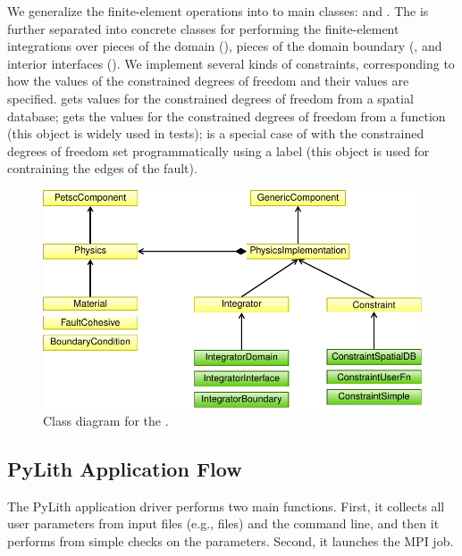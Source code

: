 We generalize the finite-element operations into to main classes:
 and . The 
is further separated into concrete classes for performing the
finite-element integrations over pieces of the domain
(), pieces of the domain boundary
(, and interior interfaces
(). We implement several kinds of
constraints, corresponding to how the values of the constrained
degrees of freedom and their values are
specified.  gets values for the
constrained degrees of freedom from a spatial database;
 gets the values for the constrained degrees
of freedom from a function (this object is widely used in tests);
 is a special case of
 with the constrained degrees of freedom set
programmatically using a label (this object is used for contraining
the edges of the fault).

\begin{figure}[htbp]
  \includegraphics[scale=0.8]{developer/figs/physics_classdiagram}
  \caption{Class diagram for the .}
  \label{fig:developer:physics:class}
\end{figure}

\subsection{PyLith Application Flow}

The PyLith application driver performs two main functions. First, it
collects all user parameters from input files (e.g., 
files) and the command line, and then it performs from simple checks
on the parameters. Second, it launches the MPI job.

